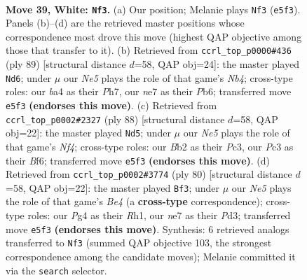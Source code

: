 \documentclass[11pt]{article}
\begin{document}
\clearpage

\begin{figure}[p]\centering
\begin{subfigure}{0.46\textwidth}\centering
\resizebox{\linewidth}{!}{%
\newchessgame
\chessboard[
  setfen={r6k/4n3/8/pp2N3/b1p3P1/P1P1b3/1B2N3/R4K2 w - - 2 39},
  showmover=false,
  pgfstyle=straightmove, color=movearrow, markmove={e5-f3}
]}
\caption{}
\end{subfigure}\hfill
\begin{subfigure}{0.46\textwidth}\centering
\resizebox{\linewidth}{!}{%
\newchessgame
\chessboard[
  setfen={3r3k/p5pp/1p2Bb2/1n6/1P2RP2/P7/5K1P/2B5 b - - 10 45},
  showmover=false,
  pgfstyle=straightmove, color=movearrow, markmove={b5-d6}
]}
\caption{}
\end{subfigure}
\\[4pt]
\begin{subfigure}{0.46\textwidth}\centering
\resizebox{\linewidth}{!}{%
\newchessgame
\chessboard[
  setfen={2r1b3/1p3p1k/5Bpp/4P3/5N1P/b1P3K1/6P1/3R4 w - - 0 45},
  showmover=false,
  pgfstyle=straightmove, color=movearrow, markmove={f4-d5}
]}
\caption{}
\end{subfigure}\hfill
\begin{subfigure}{0.46\textwidth}\centering
\resizebox{\linewidth}{!}{%
\newchessgame
\chessboard[
  setfen={5r2/1p1k3p/6p1/3P4/1P2BpPP/1K1Pb3/8/7R w - - 5 41},
  showmover=false,
  pgfstyle=straightmove, color=movearrow, markmove={e4-f3}
]}
\caption{}
\end{subfigure}
\caption{\textbf{Move 39, White: \texttt{Nf3}.} (a) Our position; Melanie plays \texttt{Nf3} (\texttt{e5f3}). Panels (b)--(d) are the retrieved master positions whose correspondence most drove this move (highest QAP objective among those that transfer to it). (b) Retrieved from \texttt{ccrl\_top\_p0000\#436} (ply 89) [structural distance $d$=58, QAP obj=24]: the master played \texttt{Nd6}; under $\mu$ our \emph{Ne5} plays the role of that game's \emph{Nb4}; cross-type roles: our \emph{b}a4 as their \emph{P}h7, our \emph{n}e7 as their \emph{P}b6; transferred move \texttt{e5f3} \textbf{(endorses this move)}. (c) Retrieved from \texttt{ccrl\_top\_p0002\#2327} (ply 88) [structural distance $d$=58, QAP obj=22]: the master played \texttt{Nd5}; under $\mu$ our \emph{Ne5} plays the role of that game's \emph{Nf4}; cross-type roles: our \emph{B}b2 as their \emph{P}c3, our \emph{P}c3 as their \emph{B}f6; transferred move \texttt{e5f3} \textbf{(endorses this move)}. (d) Retrieved from \texttt{ccrl\_top\_p0002\#3774} (ply 80) [structural distance $d$=58, QAP obj=22]: the master played \texttt{Bf3}; under $\mu$ our \emph{Ne5} plays the role of that game's \emph{Be4} (a \textbf{cross-type} correspondence); cross-type roles: our \emph{P}g4 as their \emph{R}h1, our \emph{n}e7 as their \emph{P}d3; transferred move \texttt{e5f3} \textbf{(endorses this move)}. Synthesis: 6 retrieved analogs transferred to \texttt{Nf3} (summed QAP objective 103, the strongest correspondence among the candidate moves); Melanie committed it via the \texttt{search} selector.}
\label{fig:thought-m76}
\end{figure}
\end{document}
